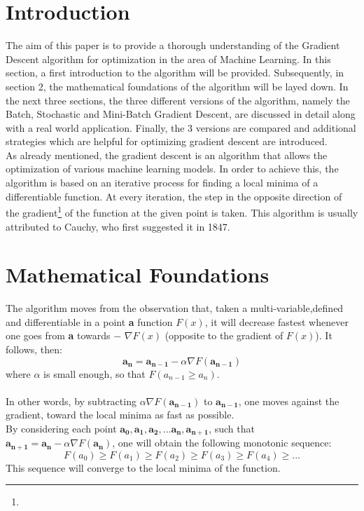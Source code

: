 \documentclass[english]{lni}
\begin{document}
\section{Introduction}
The aim of this paper is to provide a thorough understanding of the Gradient Descent algorithm for optimization in the area of Machine Learning. In this section, a first introduction to the algorithm will be provided. Subsequently, in section 2, the mathematical foundations of the algorithm will be layed down. In the next three sections, the three different versions of the algorithm, namely the Batch, Stochastic and Mini-Batch Gradient Descent, are discussed in detail along with a real world application. Finally, the 3 versions are compared and additional strategies which are helpful for optimizing gradient descent are introduced. 
\\
As already mentioned, the gradient descent is an algorithm that allows the optimization of various machine learning models. In order to achieve this, the algorithm is based on an iterative process for finding a local minima of a differentiable function. At every iteration, the step in the opposite direction of the gradient\footnote{ } of the function at the given point is taken. 
This algorithm is usually attributed to Cauchy, who first suggested it in 1847.
\section{Mathematical Foundations}
The algorithm moves from the observation that, taken a multi-variable,defined and differentiable in a point \textbf{a} function $F(x)$, it will decrease fastest whenever one goes from \textbf{a}  towards $-$ $\nabla F(x)$  (opposite to the gradient of $F(x)$).
It follows, then:
\begin{equation}
    \mathbf{a_{n}} = \mathbf{a_{n-1}} - \alpha\nabla F(\mathbf{a_{n-1}})\label{eq:original}
\end{equation}
where $\alpha$ is small enough, so that $F(a_{n-1} \geq a_{n})$.\\\\
In other words, by subtracting $\alpha\nabla F(\mathbf{a_{n-1}})$ to $\mathbf{a_{n-1}}$, one moves against the gradient, toward the local minima as fast as possible. \\By considering each point $\mathbf{a_{0}},\mathbf{a_{1}},\mathbf{a_{2}},...\mathbf{a_{n},\mathbf{a_{n+1}}}$, such that 
$\mathbf{a_{n+1}} = \mathbf{a_{n}} - \alpha\nabla F(\mathbf{a_{n}})$, one will obtain the following monotonic sequence:
\[
   F(a_{0}) \geq F(a_{1})\geq F(a_{2})\geq F(a_{3})\geq F(a_{4}) \geq ...
\]
\cite{WikiGD}
This sequence will converge to the local minima of the function.
\end{document}
